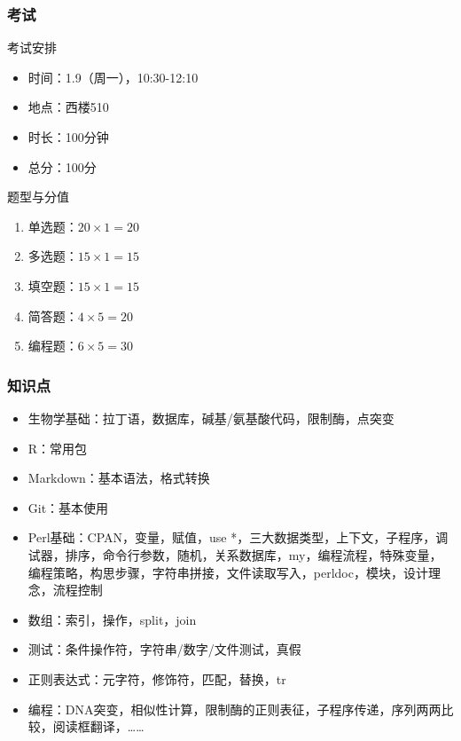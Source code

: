 \begin{frame}[plain]
\end{frame}

\begin{frame}
  \frametitle{考试}
  \begin{block}{考试安排}
    \begin{itemize}
      \item 时间：1.9（周一），10:30-12:10
      \item 地点：西楼510
      \item 时长：100分钟
      \item 总分：100分
    \end{itemize}
  \end{block}
  \pause
  \begin{block}{题型与分值}
    \begin{enumerate}
      \item 单选题：$20 \times 1 = 20$
      \item 多选题：$15 \times 1 = 15$
      \item 填空题：$15 \times 1 = 15$
      \item 简答题：$4 \times 5 = 20$
      \item 编程题：$6 \times 5 = 30$
    \end{enumerate}
  \end{block}
\end{frame}

\begin{frame}
  \frametitle{知识点}
  \begin{itemize}
    \item 生物学基础：拉丁语，数据库，碱基/氨基酸代码，限制酶，点突变
    \item R：常用包
    \item Markdown：基本语法，格式转换
    \item Git：基本使用
    \item Perl基础：CPAN，变量，赋值，use *，三大数据类型，上下文，子程序，调试器，排序，命令行参数，随机，关系数据库，my，编程流程，特殊变量，编程策略，构思步骤，字符串拼接，文件读取写入，perldoc，模块，设计理念，流程控制
    \item 数组：索引，操作，split，join
    \item 测试：条件操作符，字符串/数字/文件测试，真假
    \item 正则表达式：元字符，修饰符，匹配，替换，tr
    \item 编程：DNA突变，相似性计算，限制酶的正则表征，子程序传递，序列两两比较，阅读框翻译，……
  \end{itemize}
\end{frame}



